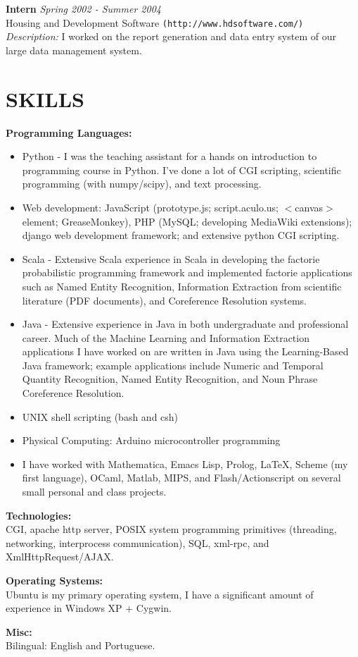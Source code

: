 \documentclass[margin]{res}
\begin{document}
\begin{resume}
        {\bf Intern} \hfill {\it Spring 2002 - Summer 2004} \\
        Housing and Development Software \texttt{(http://www.hdsoftware.com/)} \\
				{\sl Description:} I worked on the report generation and data entry system of our large data management system.

\section{SKILLS} 
		{\bf Programming Languages:}
		\begin{itemize}
			\item Python - I was the teaching assistant for a hands on introduction to programming course in Python. I've done a lot of CGI scripting, scientific programming (with numpy/scipy), and text processing.
			\item Web development: JavaScript (prototype.js; script.aculo.us; $<$canvas$>$ element; GreaseMonkey), PHP (MySQL; developing MediaWiki extensions); django web development framework; and extensive python CGI scripting.
            \item Scala - Extensive Scala experience in Scala in developing the factorie probabilistic programming framework and implemented factorie applications such as Named Entity Recognition, Information Extraction from scientific literature (PDF documents), and Coreference Resolution systems.
			\item Java - Extensive experience in Java in both undergraduate and professional career. Much of the Machine Learning and Information Extraction applications I have worked on are written in Java using the Learning-Based Java framework; example applications include Numeric and Temporal Quantity Recognition, Named Entity Recognition, and Noun Phrase Coreference Resolution.
			\item UNIX shell scripting (bash and csh)
			\item Physical Computing: Arduino microcontroller programming
			\item I have worked with Mathematica, Emacs Lisp, Prolog, \LaTeX, Scheme (my first language), OCaml, Matlab, MIPS, and Flash/Actionscript on several small personal and class projects.
   \end{itemize}

   {\bf Technologies:} \\
   CGI, apache http server, POSIX system programming primitives (threading, networking, interprocess communication), SQL, xml-rpc, and XmlHttpRequest/AJAX. \\ \vspace{-18pt}
   
   {\bf Operating Systems:}\\ 
   Ubuntu is my primary operating system, I have a significant amount of experience in Windows XP + Cygwin.
 \\ \vspace{-18pt}

   {\bf Misc:} \\ 
   Bilingual: English and Portuguese. 

\end{resume}
\end{document}
